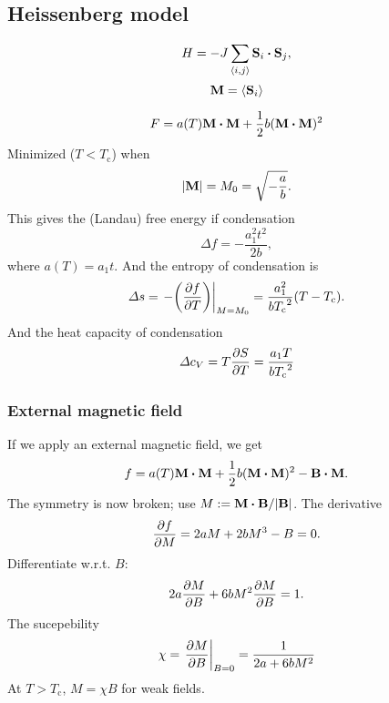 \documentclass[11pt,letter, swedish, english, twocolumn
]{article}
\newcommand{\Tc}{\ensuremath{{T_{\text{c}}}}}
\begin{document}
\subsection{Heissenberg model}
\begin{equation}
H=-J\sum_{\ev{i,j}}\vb{S}_i\vdot\vb{S}_j,
\end{equation}
\begin{equation}
\vb{M}=\ev{\vb{S}_i}
\end{equation}

\begin{equation}
F=a(T)\vb{M}\vdot\vb{M}+\frac{1}{2}b(\vb{M}\vdot\vb{M})^2
\end{equation}
Minimized ($T<\Tc$) when
\begin{equation}
\abs{\vb{M}}=M_0=\sqrt{-\frac{a}{b}}.
\end{equation}
This gives the (Landau) free energy if condensation
\begin{equation}
\varDelta{f}=-\frac{a_1^2t^2}{2b},
\end{equation}
where $a(T)=a_1t$. And the entropy of condensation is
\begin{equation}
\varDelta{s}=\eval{-\qty(\pdv{f}{T})}_{M=M_0}=\frac{a_1^2}{b\Tc^2}(T-\Tc).
\end{equation}
And the heat capacity of condensation
\begin{equation}
\varDelta{c_V}=T\pdv{S}{T}=\frac{a_1T}{b\Tc^2}
\end{equation}

\subsubsection{External magnetic field}
If we apply an external magnetic field, we get
\begin{equation}
f=a(T)\vb{M}\vdot\vb{M}+\frac{1}{2}b(\vb{M}\vdot\vb{M})^2-\vb{B}\vdot\vb{M}.
\end{equation}
The symmetry is now broken; use
$M:=\vb{M}\vdot\vb{B}/\abs{\vb{B}}$. The derivative
\begin{equation}
\pdv{f}{M}=2aM+2bM^3-B=0.
\end{equation}
Differentiate w.r.t. $B$:
\begin{equation}
2a\pdv{M}{B}+6bM^2\pdv{M}{B}=1.
\end{equation}
The sucepebility
\begin{equation}
\chi=\eval{\pdv{M}{B}}_{B=0}=\frac{1}{2a+6bM^2}
\end{equation}
At $T>\Tc$, $M=\chi B$ for weak fields.
\end{document}

